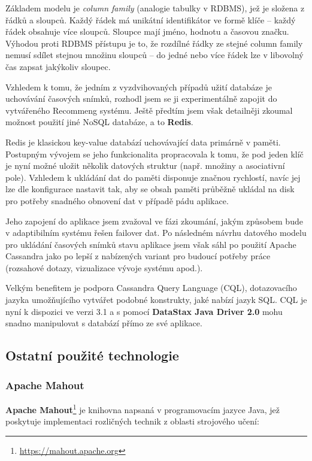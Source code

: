 \documentclass[thesis=M,czech]{FITthesis}[2014/05/07]
\begin{document}
Základem modelu je \emph{column family} (analogie tabulky v RDBMS), jež je složena z řádků a sloupců. Každý řádek má unikátní identifikátor ve formě klíče – každý řádek obsahuje více sloupců. Sloupce mají jméno, hodnotu a časovou značku. Výhodou proti RDBMS přístupu je to, že rozdílné řádky ze stejné column family nemusí sdílet stejnou množinu sloupců – do jedné nebo více řádek lze v libovolný čas zapsat jakýkoliv sloupec.

Vzhledem k tomu, že jedním z vyzdvihovaných případů užití databáze je uchovávání časových snímků, rozhodl jsem se ji experimentálně zapojit do vytvářeného Recommeng systému. Ještě předtím jsem však detailněji zkoumal možnost použití jiné NoSQL databáze, a to \textbf{Redis}. 

Redis je klasickou key-value databází uchovávající data primárně v paměti. Postupným vývojem se jeho funkcionalita propracovala k tomu, že pod jeden klíč je nyní možné uložit několik datových struktur (např. množiny a asociativní pole). Vzhledem k ukládání dat do paměti disponuje značnou rychlostí, navíc jej lze dle konfigurace nastavit tak, aby se obsah paměti průběžně ukládal na disk pro potřeby snadného obnovení dat v případě pádu aplikace.

Jeho zapojení do aplikace jsem zvažoval ve fázi zkoumání, jakým způsobem bude v adaptibilním systému řešen failover dat. Po následném návrhu datového modelu pro ukládání časových snímků stavu aplikace jsem však sáhl po použití Apache Cassandra jako po lepší z nabízených variant pro budoucí potřeby práce (rozsahové dotazy, vizualizace vývoje systému apod.). 

Velkým benefitem je podpora Cassandra Query Language (CQL), dotazovacího jazyka umožňujícího vytvářet podobné konstrukty, jaké nabízí jazyk SQL. CQL je nyní k dispozici ve verzi 3.1 a s pomocí \textbf{DataStax Java Driver 2.0} mohu snadno manipulovat s databází přímo ze své aplikace. 

\subsection{Ostatní použité technologie}

\subsubsection{Apache Mahout}
\textbf{Apache Mahout}\footnote{\url{https://mahout.apache.org}} je knihovna napsaná v programovacím jazyce Java, jež poskytuje implementaci rozličných technik z oblasti strojového učení:
\end{document}

